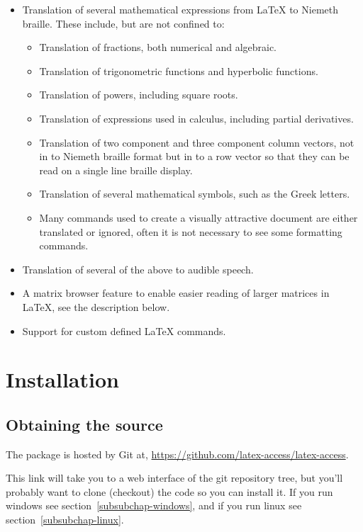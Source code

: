 \documentclass[12pt,a4paper]{report}
\begin{document}
\begin{itemize}
\item Translation of several mathematical expressions from LaTeX to
Niemeth braille. These include, but are not confined
to:
\begin{itemize}
\item Translation of fractions, both numerical and
algebraic.
\item Translation of trigonometric
functions and hyperbolic functions.
\item Translation of powers,
including square roots.
\item Translation of
expressions used in calculus, including partial derivatives.
\item Translation of two component and three component column vectors,
  not in to Niemeth braille format but in to a row vector so that they
  can be read on a single line braille display.
\item Translation of several mathematical symbols, such as the Greek letters.
\item Many commands used to create a visually attractive document are
  either translated or ignored, often it is not necessary to see some
  formatting commands.
\end{itemize}

\item Translation of several of the above to audible speech.
\item A matrix browser feature to enable easier reading of larger
  matrices in LaTeX, see the description below.
\item Support for custom defined LaTeX commands.
\end{itemize}

\chapter{Installation}
\label{ch-installation}

\section{Obtaining the source}
\label{subchap-obtaining-source}
The package is hosted by Git at,
\url{https://github.com/latex-access/latex-access}.

This link will take you to a web interface of the git repository tree, but you'll
probably want to clone (checkout) the code so you can install it. If you run
windows see section~\ref{subsubchap-windows}, and if you run linux
see section~\ref{subsubchap-linux}.
\end{document}
